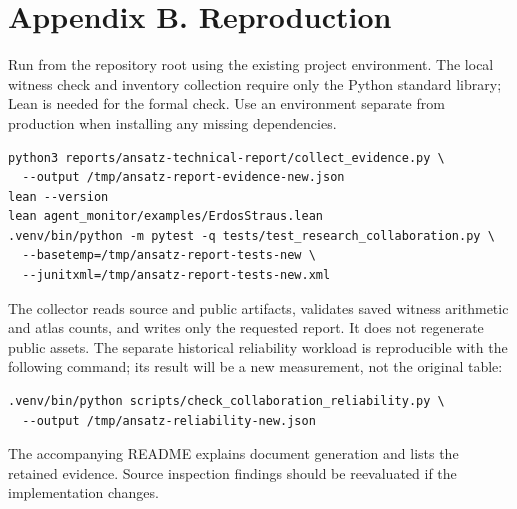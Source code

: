 \documentclass[11pt,a4paper]{article}
\begin{document}
\clearpage

\section*{Appendix B. Reproduction}

Run from the repository root using the existing project environment. The local witness check and inventory collection require only the Python standard library; Lean is needed for the formal check. Use an environment separate from production when installing any missing dependencies.

\begin{lstlisting}
python3 reports/ansatz-technical-report/collect_evidence.py \
  --output /tmp/ansatz-report-evidence-new.json
lean --version
lean agent_monitor/examples/ErdosStraus.lean
.venv/bin/python -m pytest -q tests/test_research_collaboration.py \
  --basetemp=/tmp/ansatz-report-tests-new \
  --junitxml=/tmp/ansatz-report-tests-new.xml
\end{lstlisting}

The collector reads source and public artifacts, validates saved witness arithmetic and atlas counts, and writes only the requested report. It does not regenerate public assets. The separate historical reliability workload is reproducible with the following command; its result will be a new measurement, not the original table:

\begin{lstlisting}
.venv/bin/python scripts/check_collaboration_reliability.py \
  --output /tmp/ansatz-reliability-new.json
\end{lstlisting}

The accompanying README explains document generation and lists the retained evidence. Source inspection findings should be reevaluated if the implementation changes.
\end{document}
